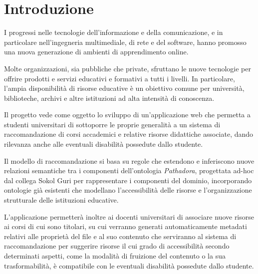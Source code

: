 %
\chapter*{Introduzione}                 %

I progressi nelle tecnologie dell'informazione e della comunicazione, e in particolare nell'ingegneria multimediale, di rete e del software, hanno promosso una nuova generazione di ambienti di apprendimento online.

Molte organizzazioni, sia pubbliche che private, sfruttano le nuove tecnologie per offrire prodotti e servizi educativi e formativi a tutti i livelli. In particolare, l'ampia disponibilità di risorse educative è un obiettivo comune per università, biblioteche, archivi e altre istituzioni ad alta intensità di conoscenza.

\vspace{5mm}

Il progetto vede come oggetto lo sviluppo di un'applicazione web che permetta a studenti universitari di sottoporre le proprie generalità a un sistema di raccomandazione di corsi accademici e relative risorse didattiche associate, dando rilevanza anche alle eventuali disabilità possedute dallo studente.

Il modello di raccomandazione si basa su regole che estendono e inferiscono nuove relazioni semantiche tra i componenti dell'ontologia \textit{Pathadora}, progettata ad-hoc dal collega Sokol Guri per rappresentare i componenti del dominio, incorporando ontologie già esistenti che modellano l'accessibilità delle risorse e l’organizzazione strutturale delle istituzioni educative. 

\vspace{5mm}

L'applicazione permetterà inoltre ai docenti universitari di associare nuove risorse ai corsi di cui sono titolari, su cui verranno generati automaticamente metadati relativi alle proprietà del file e al suo contenuto che serviranno al sistema di raccomandazione per suggerire risorse il cui grado di accessibilità secondo determinati aspetti, come la modalità di fruizione del contenuto o la sua trasformabilità, è compatibile con le eventuali disabilità possedute dallo studente.

